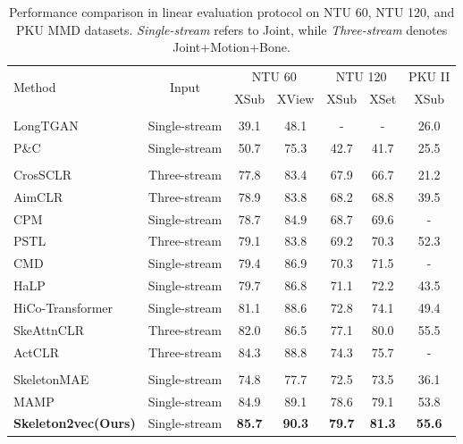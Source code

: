 \begin{table}[tb]
    \caption{
      Performance comparison in linear evaluation protocol
      on NTU 60, NTU 120, and PKU MMD datasets.
      \textit{Single-stream} refers to Joint,
      while \textit{Three-stream} denotes Joint+Motion+Bone.
    }
    \centering
    \setlength{\tabcolsep}{4pt} %
    \begin{tabular}{l c c c c c c}
      \toprule
      \multirow{2}{*}{Method} &
      \multirow{2}{*}{Input} &
      \multicolumn{2}{c}{NTU 60} &
      \multicolumn{2}{c}{NTU 120} &
      PKU II\\
      & & XSub & XView & XSub & XSet & XSub \\
      \midrule
      \rowcolor{Gray!20} \multicolumn{7}{l}{\textit{Other pretext tasks:}} \\
      LongTGAN \cite{zheng2018unsupervised} & Single-stream & 39.1 & 48.1 & - & - & 26.0 \\
      P\&C \cite{su2020predict} & Single-stream & 50.7 & 75.3 & 42.7 & 41.7 & 25.5 \\
      \midrule
      \rowcolor{Gray!20} \multicolumn{7}{l}{\textit{Contrastive Learning:}} \\
      CrosSCLR \cite{li20213d} & Three-stream & 77.8 & 83.4 & 67.9 & 66.7 & 21.2 \\
      AimCLR \cite{guo2022contrastive} & Three-stream & 78.9 & 83.8 & 68.2  & 68.8 & 39.5 \\
      CPM \cite{zhang2022contrastive} & Single-stream & 78.7 & 84.9 & 68.7 & 69.6 & - \\
      PSTL \cite{Zhou2023SelfsupervisedAR} & Three-stream & 79.1 & 83.8 & 69.2 & 70.3 & 52.3 \\
      CMD \cite{mao2022cmd} & Single-stream & 79.4 & 86.9 & 70.3 & 71.5 & - \\
      HaLP \cite{shah2023halp} & Single-stream & 79.7 & 86.8 & 71.1 & 72.2 & 43.5 \\
      HiCo-Transformer \cite{hico2023} & Single-stream & 81.1 & 88.6 & 72.8 & 74.1 & 49.4 \\
      SkeAttnCLR \cite{Hua2023SkeAttnCLR} & Three-stream & 82.0 & 86.5 & 77.1 & 80.0 & 55.5 \\
      ActCLR \cite{lin2023actionlet} & Three-stream & 84.3 & 88.8 & 74.3 & 75.7 & - \\
      \midrule
      \rowcolor{Gray!20} \multicolumn{7}{l}{\textit{Masked Prediction:}} \\
      SkeletonMAE \cite{yan2023skeletonmae} & Single-stream & 74.8 & 77.7 & 72.5 & 73.5 & 36.1 \\
      MAMP \cite{mao2023masked} & Single-stream & 84.9 & 89.1 & 78.6 & 79.1 & 53.8 \\
      \textbf{Skeleton2vec(Ours)} & Single-stream & \textbf{85.7} & \textbf{90.3} & \textbf{79.7} & \textbf{81.3} & \textbf{55.6} \\
      \bottomrule
    \end{tabular}
    \label{tab:linear}
\end{table}


